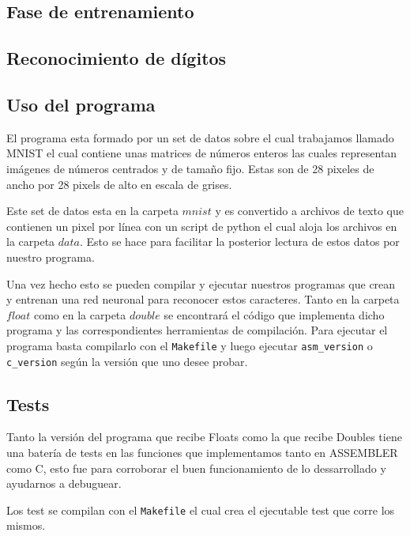 \subsection{Fase de entrenamiento}
\subsection{Reconocimiento de dígitos}

\subsection{Uso del programa}

El programa esta formado por un set de datos sobre el cual trabajamos llamado MNIST el cual contiene unas matrices de números enteros las cuales representan imágenes de números centrados y de tamaño fijo. Estas son de 28 pixeles de ancho por 28 pixels de alto en escala de grises.

Este set de datos esta en la carpeta $mnist$ y es convertido a archivos de texto que contienen un pixel por línea con un script de python el cual aloja los archivos en la carpeta $data$. Esto se hace para facilitar la posterior lectura de estos datos por nuestro programa.

Una vez hecho esto se pueden compilar y ejecutar nuestros programas que crean y entrenan una red neuronal para reconocer estos caracteres. Tanto en la carpeta $float$ como en la carpeta $double$ se encontrará el código que implementa dicho programa y las correspondientes herramientas de compilación. Para ejecutar el programa basta compilarlo con el \texttt{Makefile} y luego ejecutar \texttt{asm\_version} o \texttt{c\_version} según la versión que uno desee probar.

\subsection{Tests}

Tanto la versión del programa que recibe Floats como la que recibe Doubles tiene una batería de tests en las funciones que implementamos tanto en ASSEMBLER como C, esto fue para corroborar el buen funcionamiento de lo dessarrollado y ayudarnos a debuguear.

Los test se compilan con el \texttt{Makefile} el cual crea el ejecutable test que corre los mismos.